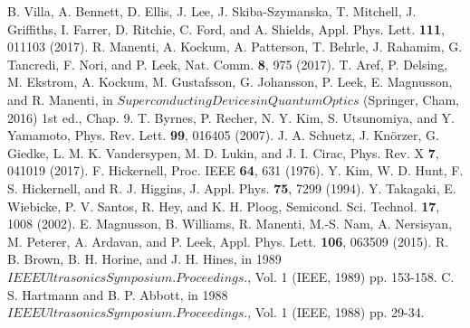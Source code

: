 \documentclass[aps,prb,amsmath,amssymb,footinbib,showpacs,superscriptaddress]{revtex4-1}%
\begin{document}
\begin{thebibliography}{9}
 B. Villa, A. Bennett, D. Ellis, J. Lee, J. Skiba-Szymanska, T. Mitchell, J. Griffiths, I. Farrer, D. Ritchie, C. Ford, and A. Shields, Appl. Phys. Lett. \textbf{111}, 011103 (2017).
 R. Manenti, A. Kockum, A. Patterson, T. Behrle, J. Rahamim, G. Tancredi, F. Nori, and P. Leek, Nat. Comm. \textbf{8}, 975 (2017). 
 T. Aref, P. Delsing, M. Ekstrom, A. Kockum, M. Gustafsson, G. Johansson, P. Leek, E. Magnusson, and R. Manenti, in $Superconducting Devices in Quantum Optics$ (Springer, Cham, 2016) 1st ed., Chap. 9.
 T. Byrnes, P. Recher, N. Y. Kim, S. Utsunomiya, and Y.  Yamamoto, Phys. Rev. Lett. \textbf{99}, 016405 (2007).
 J. A. Schuetz, J. Kn\"orzer, G. Giedke, L. M. K. Vandersypen, M. D. Lukin, and J. I. Cirac, Phys. Rev. X \textbf{7}, 041019 (2017).
 F. Hickernell, Proc. IEEE \textbf{64}, 631 (1976).
 Y. Kim, W. D. Hunt, F. S. Hickernell, and R. J. Higgins, J. Appl. Phys. \textbf{75}, 7299 (1994).
 Y. Takagaki, E. Wiebicke, P. V. Santos, R. Hey, and K. H. Ploog, Semicond. Sci. Technol. \textbf{17}, 1008 (2002).
 E. Magnusson, B. Williams, R. Manenti, M.-S. Nam, A. Nersisyan, M. Peterer, A. Ardavan, and P. Leek, Appl. Phys. Lett. \textbf{106}, 063509 (2015).
 R. B. Brown, B. H. Horine, and J. H. Hines, in 1989 $IEEE Ultrasonics Symposium. Proceedings.$, Vol. 1 (IEEE, 1989) pp. 153-158.
 C. S. Hartmann and B. P. Abbott, in 1988 $IEEE Ultrasonics Symposium. Proceedings.$, Vol. 1 (IEEE, 1988) pp. 29-34.

\end{thebibliography}
\end{document}
